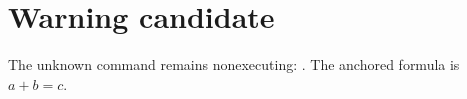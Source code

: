 \section{Warning candidate}
The unknown command remains nonexecuting: .
The anchored formula is $a+b=c$.
